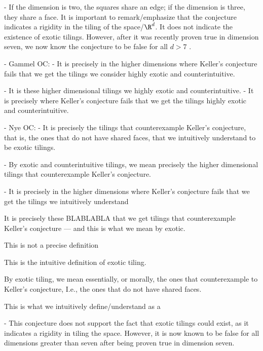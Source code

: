 - If the dimension is two, the squares share an edge; if the dimension is three, they share a face. It is important to remark/emphasize that the conjecture indicates a rigidity in the tiling of the space/$\R^d$. It does not indicate the existence of exotic tilings. However, after it was recently proven true in dimension seven, we now know the conjecture to be false for all $d>7$ \cite{brakensiekResolutionKellerConjecture2020}.

- Gammel OC: 
- It is precisely in the higher dimensions where Keller's conjecture fails that we get the tilings we consider highly exotic and counterintuitive.

- It is these higher dimensional tilings we  highly exotic and counterintuitive.
- It is precisely where Keller's conjecture fails that we get the tilings  highly exotic and counterintuitive. %


- Nye OC:
- It is precisely the tilings that counterexample Keller's conjecture, that is, the ones that do not have shared faces, that we intuitively understand to be exotic tilings. 

- By exotic and counterintuitive tilings, we mean precisely the higher dimensional tilings that counterexample Keller's conjecture. 


- It is precisely in the higher dimensions where Keller's conjecture fails that we get the tilings we intuitively understand 

It is precisely these BLABLABLA that we get tilings that counterexample Keller's conjecture — and this is what we mean by exotic. 

This is not a precise definition

This is the intuitive definition of exotic tiling. 

By exotic tiling, we mean essentially, or morally, the ones that counterexample to Keller's conjecture, I.e., the ones that do not have shared faces. 

This is what we intuitively define/understand as a  


- This conjecture does not support the fact that exotic tilings could exist, as it indicates a rigidity in tiling the space. However, it is now known to be false for all dimensions greater than seven after being proven true in dimension seven.

